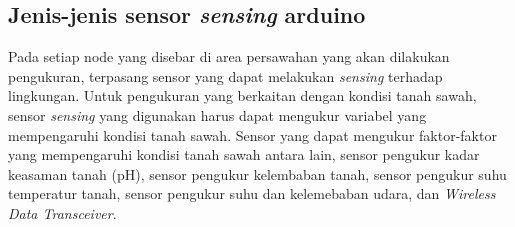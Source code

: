 \subsection{Jenis-jenis sensor \textit{sensing} arduino}
Pada setiap node yang disebar di area persawahan yang akan dilakukan pengukuran, terpasang sensor yang dapat melakukan \textit{sensing} terhadap lingkungan. Untuk pengukuran yang berkaitan dengan kondisi tanah sawah, sensor \textit{sensing} yang digunakan harus dapat mengukur variabel yang mempengaruhi kondisi tanah sawah. Sensor yang dapat mengukur faktor-faktor yang mempengaruhi kondisi tanah sawah antara lain, sensor pengukur kadar keasaman tanah (pH), sensor pengukur  kelembaban tanah, sensor pengukur suhu temperatur tanah, sensor pengukur suhu dan kelemebaban udara, dan \textit{Wireless Data Transceiver}.

